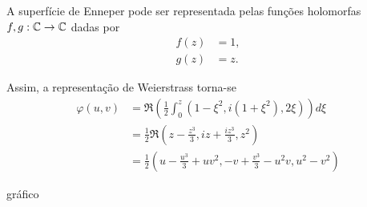 \begin{exemplo}
	A superfície de Enneper pode ser representada pelas funções holomorfas $f,g: \mathbb{C} \rightarrow \mathbb{C}$ dadas por
	\begin{align*}
		f(z) &= 1, \\
		g(z) &= z.
	\end{align*}
	
	Assim, a representação de Weierstrass torna-se
	\begin{align*}
		\varphi(u,v) &= \Re \left( \frac{1}{2} \int_{0}^{z} \left( 1 - \xi^2, i (1 + \xi^2), 2\xi \right) \right) d\xi \\
		&= \frac{1}{2} \Re \left( z - \frac{z^3}{3}, iz + \frac{iz^3}{3}, z^2 \right) \\
		&= \frac{1}{2} \left( u - \frac{u^3}{3} + uv^2, -v + \frac{v^3}{3} - u^2v, u^2 - v^2 \right)
	\end{align*}
	
	gráfico
\end{exemplo}

